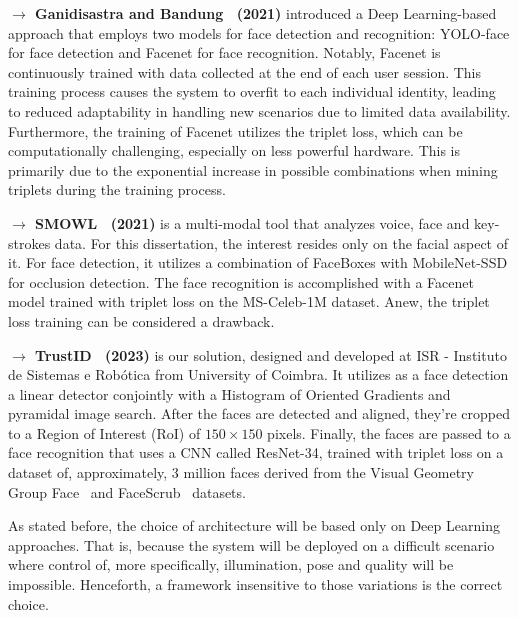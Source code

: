 \documentclass[class=report, crop=false, a4paper, 12pt]{standalone}
\begin{document}
\vspace{0.7\baselineskip}
\noindent\textbf{$\rightarrow$ Ganidisastra and Bandung~\autocite{ganidisastraIncrementalTrainingDeep2021} (2021)} introduced a Deep Learning-based approach that employs two models for face detection and recognition: YOLO-face for face detection and Facenet for face recognition. Notably, Facenet is continuously trained with data collected at the end of each user session. This training process causes the system to overfit to each individual identity, leading to reduced adaptability in handling new scenarios due to limited data availability. Furthermore, the training of Facenet utilizes the triplet loss, which can be computationally challenging, especially on less powerful hardware. This is primarily due to the exponential increase in possible combinations when mining triplets during the training process.

\vspace{0.7\baselineskip}
\noindent\textbf{$\rightarrow$ SMOWL~\autocite{labayenOnlineStudentAuthentication2021} (2021)} is a multi-modal tool that analyzes voice, face and key-strokes data. For this dissertation, the interest resides only on the facial aspect of it. For face detection, it utilizes a combination of FaceBoxes with MobileNet-SSD for occlusion detection. The face recognition is accomplished with a Facenet model trained with triplet loss on the MS-Celeb-1M dataset. Anew, the triplet loss training can be considered a drawback. 

\vspace{0.7\baselineskip}
\noindent\textbf{$\rightarrow$ TrustID~\autocite{fariaImagebasedFaceVerification2023} (2023)} is our solution, designed and developed at ISR - Instituto de Sistemas e Robótica from University of Coimbra. It utilizes as a face detection a linear detector conjointly with a Histogram of Oriented Gradients and pyramidal image search. After the faces are detected and aligned, they're cropped to a Region of Interest (RoI) of $150\times150$ pixels. Finally, the faces are passed to a face recognition that uses a CNN called ResNet-34, trained with triplet loss on a dataset of, approximately, 3 million faces derived from the Visual Geometry Group
Face~\autocite{parkhiDeepFaceRecognition2015} and FaceScrub~\autocite{ngDatadrivenApproachCleaning2014} datasets.


\vspace{\baselineskip}
\par As stated before, the choice of architecture will be based only on Deep Learning approaches. That is, because the system will be deployed on a difficult scenario where control of, more specifically, illumination, pose and quality will be impossible. Henceforth, a framework insensitive to those variations is the correct choice.
\end{document}
